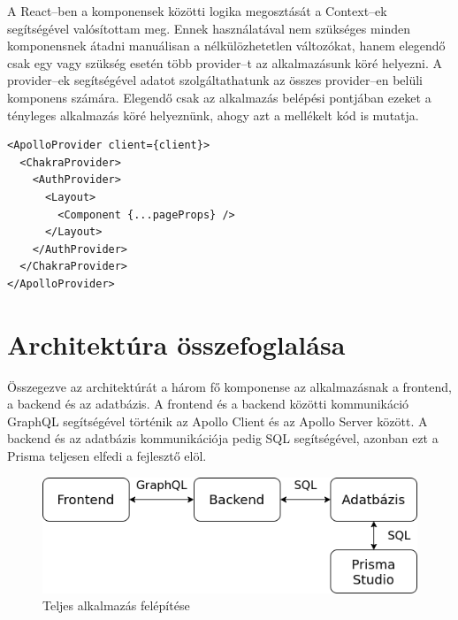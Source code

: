 A React–ben a komponensek közötti logika megosztását a Context–ek segítségével valósítottam meg.
Ennek használatával nem szükséges minden komponensnek átadni manuálisan a nélkülözhetetlen változókat, hanem elegendő csak egy vagy szükség esetén több provider–t az alkalmazásunk köré helyezni.
A provider–ek segítségével adatot szolgáltathatunk az összes provider–en belüli komponens számára.
Elegendő csak az alkalmazás belépési pontjában ezeket a tényleges alkalmazás köré helyeznünk, ahogy azt a mellékelt kód is mutatja.

\begin{lstlisting}[style=ES6, caption=Frontendhez használt provider–ek]    
<ApolloProvider client={client}>
  <ChakraProvider>
    <AuthProvider>
      <Layout>
        <Component {...pageProps} />
      </Layout>
    </AuthProvider>
  </ChakraProvider>
</ApolloProvider>
\end{lstlisting}


\section{Architektúra összefoglalása}
Összegezve az architektúrát a három fő komponense az alkalmazásnak a frontend, a backend és az adatbázis.
A frontend és a backend közötti kommunikáció GraphQL segítségével történik az Apollo Client és az Apollo Server között.
A backend és az adatbázis kommunikációja pedig SQL segítségével, azonban ezt a Prisma teljesen elfedi a fejlesztő elöl.

\begin{figure}[!ht]
  \centering
  \includegraphics[width=150mm, keepaspectratio]{figures/architecture.png}
  \caption{Teljes alkalmazás felépítése}
  \label{fig:architecture}
\end{figure}